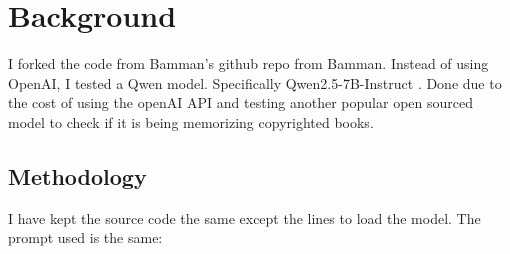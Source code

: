 \documentclass[12pt]{article}
\begin{document}
    \singlespacing
    \setlength{\parindent}{36pt}
    \section*{Background}
    I forked the code from Bamman's github repo from Bamman. Instead of using
    OpenAI, I tested a Qwen model. Specifically Qwen2.5-7B-Instruct \citep{qwen2,qwen2.5}.
    Done due to the cost of using the openAI API and testing another popular open
    sourced model to check if it is being memorizing copyrighted books.

    \subsection*{Methodology}
    I have kept the source code the same except the lines to load the model. The
    prompt used is the same:
\end{document}
